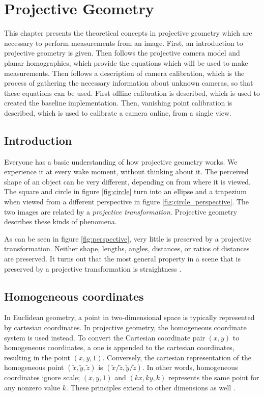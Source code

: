 \chapter{Projective Geometry} \label{chapter:projective_geometry}
This chapter presents the theoretical concepts in projective geometry which are necessary to perform measurements from an image.
First, an introduction to projective geometry is given.
Then follows the projective camera model and planar homographies, which provide the equations which will be used to make measurements.
Then follows a description of camera calibration, which is the process of gathering the necessary information about unknown cameras, so that these equations can be used. 
First offline calibration is described, which is used to created the baseline implementation.
Then, vanishing point calibration is described, which is used to calibrate a camera online, from a single view.

\section{Introduction}
Everyone has a basic understanding of how projective geometry works.
We experience it at every wake moment, without thinking about it. 
The perceived shape of an object can be very different, depending on from where it is viewed.
The square and circle in figure \ref{fig:circle} turn into an ellipse and a trapezium when viewed from a different perspective in figure \ref{fig:circle_perspective}.
The two images are related by a \textit{projective transformation}.
Projective geometry describes these kinds of phenomena.



As can be seen in figure \ref{fig:perspective}, very little is preserved by a projective transformation.
Neither shape, lengths, angles, distances, or ratios of distances are preserved.
It turns out that the most general property in a scene that is preserved by a projective transformation is straightness \cite[p. 1]{hartley-zisserman}.

\section{Homogeneous coordinates}

In Euclidean geometry, a point in two-dimensional space is typically represented by cartesian coordinates.
In projective geometry, the homogeneous coordinate system is used instead.
To convert the Cartesian coordinate pair $(x,y)$ to homogeneous coordinates, a one is appended to the cartesian coordinates, resulting in the point $(x,y,1)$. 
Conversely, the cartesian representation of the homogeneous point $(\tilde{x},\tilde{y},\tilde{z})$ is $(\tilde{x}/\tilde{z},\tilde{y}/\tilde{z})$. 
In other words, homogeneous coordinates ignore scale; $(x,y,1)$ and $(kx,ky,k)$ represents the same point for any nonzero value $k$.
These principles extend to other dimensions as well \cite[p. 2]{hartley-zisserman}.

